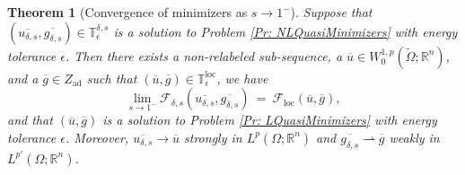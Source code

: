 \documentclass[11pt, reqno]{amsart}   	%
\theoremstyle{plain}
\numberwithin{equation}{section}
\newtheorem{theorem}[thm]{Theorem}
\def\de{\delta}
\def\ep{\epsilon}
\def\Om{\Omega}
\def\R{\mathbb{R}}
\def\loc{\text{loc}}
\begin{document}
\begin{theorem}[Convergence of minimizers as $s \rightarrow 1^-$]\label{Thm: QuasiMinimizersConvergenceOfMinss->1}
    Suppose that $(\overline{u_{\de, s}}, \overline{g_{\de, s}}) \in \mathbb{T}^{\de, s}_{\ep}$ is a solution to Problem \ref{Pr: NLQuasiMinimizers} with energy tolerance $\ep$. Then there exists a non-relabeled sub-sequence, a $\overline{u} \in W^{1, p}_0(\widetilde{\Om}; \R^n)$, and a $\overline{g} \in Z_{\text{ad}}$ such that $(\overline{u}, \overline{g}) \in \mathbb{T}^{\loc}_{\ep}$, we have
    \begin{equation}\label{Eq: QuasiMinimizersConvergenceOfMinss->1}
        \lim_{s \rightarrow 1^-}\mathcal{F}_{\de, s}(\overline{u_{\de, s}}, \overline{g_{\de, s}}) \ = \ \mathcal{F}_{\loc}(\overline{u}, \overline{g}),
    \end{equation}
    and that $(\overline{u}, \overline{g})$ is a solution to Problem \ref{Pr: LQuasiMinimizers} with energy tolerance $\ep$. Moreover, $\overline{u_{\de, s}} \rightarrow \overline{u}$ strongly in $L^p(\Om; \R^n)$ and $\overline{g_{\de, s}} \rightharpoonup \overline{g}$ weakly in $L^{p'}(\Om; \R^n)$.
 \end{theorem}
\end{document}
